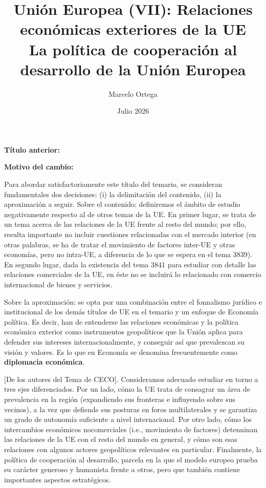 \documentclass[10pt,a4paper]{article}
\title{Unión Europea (VII): Relaciones económicas exteriores de la UE\\
\large La política de cooperación al desarrollo de la Unión Europea}
\author{Marcelo Ortega}
\date{Julio 2026}
\newcommand{\puntosclave}[1]{%
  \begin{tcolorbox}[
    colframe=black,
    title={Puntos clave},
    before upper={\setlength{\parindent}{0.5cm}\setlength{\parskip}{0.5\baselineskip}}
  ]
  #1
  \end{tcolorbox}
}
\newcommand{\changebox}{%
\begin{tcolorbox}[title={Historial de cambios del tema}]
\textbf{Título anterior:} \OldTitle\par
\textbf{Motivo del cambio:} \ChangeWhy
\end{tcolorbox}
}
\begin{document}
\maketitle
\changebox

\newpage

\puntosclave{ %
     Para abordar satisfactoriamente este título del temario, se consideran fundamentales dos decisiones: (i) la delimitación del contenido, (ii) la aproximación a seguir. Sobre el contenido: definiremos el ámbito de estudio negativamente respecto al de otros temas de la UE. En primer lugar, se trata de un tema acerca de las relaciones de la UE frente al resto del mundo; por ello, resulta importante no incluir cuestiones relacionadas con el mercado interior (en otras palabras, se ha de tratar el movimiento de factores inter-UE y otras economías, pero no intra-UE, a diferencia de lo que se espera en el tema 3839). En segundo lugar, dada la existencia del tema 3841 para estudiar con detalle las relaciones comerciales de la UE, en éste no se incluirá lo relacionado con comercio internacional de bienes y servicios.

     Sobre la aproximación: se opta por una combinación entre el fonnalismo jurídico e institucional de los demás títulos de UE en el temario y un enfoque de Economía política. Es decir, han de entenderse las relaciones económicas y la política económica exterior como instrumentos geopolíticos que la Unión aplica para defender sus intereses internacionalmente, y conseguir así que prevalezcan su visión y valores. Es lo que en Economía se denomina frecuentemente como \textbf{diplomacia económica}.

     [De los autores del Tema de CECO]. Consideramos adecuado estudiar en torno a tres ejes diferenciados. Por un lado, cómo la UE trata de consagrar un área de prevalencia en la región (expandiendo sus fronteras e influyendo sobre sus vecinos), a la vez que defiende sus posturas en foros multilaterales y se garantiza un grado de autonomía suficiente a nivel internacional. Por otro lado, cómo los intercambios económicos nocomerciales (i.e., movimiento de factores) detenninan las relaciones de la UE con el resto del mundo en general, y cómo son esas relaciones con algunos actores geopolíticos relevantes en particular. Finalmente, la política de cooperación al desarrollo, parcela en la que el modelo europeo prueba su carácter generoso y humanista frente a otros, pero que también contiene importantes aspectos estratégicos.
    }
\vspace{1cm}
\end{document}
